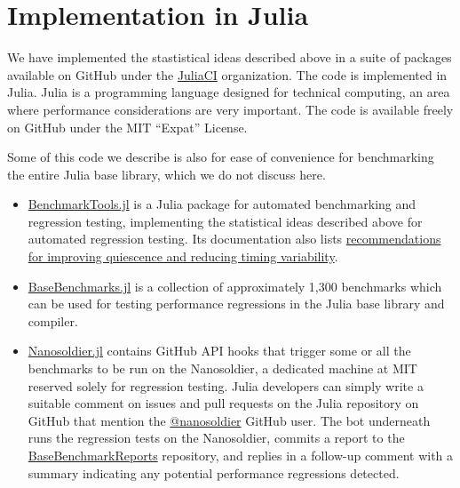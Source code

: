 \documentclass[conference]{IEEEtran}
\begin{document}


\section{Implementation in Julia}

We have implemented the stastistical ideas described above in a suite of packages available on GitHub under the \href{https://github.com/JuliaCI}{JuliaCI} organization.
The code is implemented in Julia. Julia is a programming language designed for technical computing, an area where performance considerations are very important.
The code is available freely on GitHub under the MIT ``Expat'' License.

Some of this code we describe is also for ease of convenience for benchmarking
the entire Julia base library, which we do not discuss here.

\begin{itemize}

\item
\href{https://github.com/JuliaCI/BenchmarkTools.jl}{BenchmarkTools.jl}
is a Julia package for automated benchmarking and regression testing, implementing the statistical ideas described above for automated regression testing. Its documentation also lists \href{https://github.com/JuliaCI/BenchmarkTools.jl/blob/60dfe83e5434c87b7311ca5d9f185f45752ed510/doc/linuxtips.md}{recommendations for improving quiescence and reducing timing variability}.

\item
\href{https://github.com/JuliaCI/BaseBenchmarks.jl}{BaseBenchmarks.jl}
is a collection of approximately 1,300 benchmarks which can be used for testing performance regressions in the Julia base library and compiler.

\item
\href{https://github.com/JuliaCI/Nanosoldier.jl}{Nanosoldier.jl}
contains GitHub API hooks that trigger some or all the benchmarks to be run on the Nanosoldier, a dedicated machine at MIT reserved solely for regression testing.
Julia developers can simply write a suitable comment on issues and pull requests on the Julia repository on GitHub that mention the \href{https://github.com/nanosoldier}{@nanosoldier} GitHub user. The bot underneath runs the regression tests on the Nanosoldier, commits a report to the \href{https://github.com/JuliaCI/BaseBenchmarkReports}{BaseBenchmarkReports} repository, and replies in a follow-up comment with a summary indicating any potential performance regressions detected.

\end{itemize}
\end{document}
